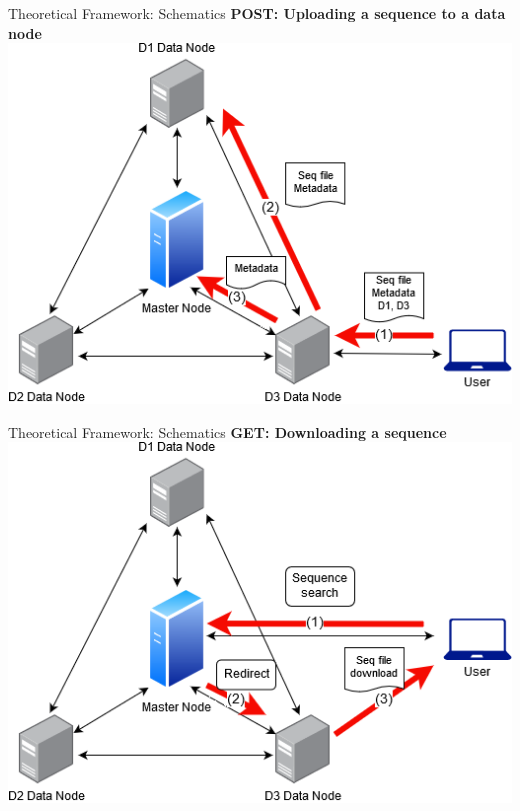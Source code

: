 \documentclass{beamer}
\begin{document}
\begin{frame}{Theoretical Framework: Schematics}
\textbf{POST: Uploading a sequence to a data node} \\ \medskip
\centering
\includegraphics[scale=0.5]{thesis2.png}
\end{frame}

\begin{frame}{Theoretical Framework: Schematics}
\textbf{GET: Downloading a sequence} \\ \medskip
\centering
\includegraphics[scale=0.5]{thesis4.png}
\end{frame}
\end{document}
